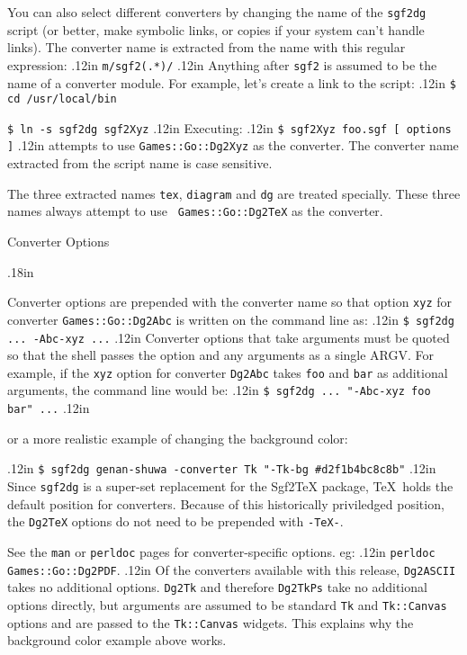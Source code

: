 You can also select different converters by changing the name of
the {\tt sgf2dg} script (or better, make symbolic links, or copies if
your system can't handle links).  The converter name is extracted
from the name with this regular expression:
\vglue.12in
    {\tt m/sgf2(.*)/}
\vglue.12in
Anything after {\tt sgf2} is assumed to be the name of a converter
module.  For example, let's create a link to the script:
\vglue.12in
    {\tt \$ cd /usr/local/bin}

    {\tt \$ ln -s sgf2dg sgf2Xyz}
\vglue.12in
Executing:
\vglue.12in
    {\tt \$ sgf2Xyz foo.sgf [ options ]}
\vglue.12in
\noindent
attempts to use {\tt Games::Go::Dg2Xyz} as the converter.  The
converter name extracted from the script name is case sensitive.


The three extracted names {\tt tex}, {\tt diagram} and {\tt dg}
are treated specially. These three names always attempt to use {\tt
Games::Go::Dg2TeX} as the converter.

% 
% 

\vfil\eject
\centerline{\titlefont Converter Options}
\vglue.18in

Converter options are prepended with the converter name so that
option {\tt xyz} for converter {\tt Games::Go::Dg2Abc} is written on
the command line as:
\vglue.12in
    {\tt \$ sgf2dg ... -Abc-xyz ...}
\vglue.12in
Converter options that take arguments must be quoted so that the
shell passes the option and any arguments as a single ARGV.  For
example, if the {\tt xyz} option for converter {\tt Dg2Abc} takes {\tt foo} and
{\tt bar} as additional arguments, the command line would be:
\vglue.12in
    {\tt \$ sgf2dg ... "-Abc-xyz foo bar" ...}
\vglue.12in

\noindent
or a more realistic example of changing the background color:

\vglue.12in
    {\tt \$ sgf2dg genan-shuwa -converter Tk "-Tk-bg \#d2f1b4bc8c8b"}
\vglue.12in
Since {\tt sgf2dg} is a super-set replacement for the Sgf2TeX package,
\TeX\ holds the default position for converters.  Because of this
historically priviledged position, the {\tt Dg2TeX} options do not need to
be prepended with {\tt -TeX-}.

See the {\tt man} or {\tt perldoc} pages for converter-specific
options.  eg:
\vglue.12in
    {\tt perldoc Games::Go::Dg2PDF}.
\vglue.12in
Of the converters available with this release, {\tt Dg2ASCII} takes
no additional options.  {\tt Dg2Tk} and therefore {\tt Dg2TkPs} take
no additional options directly, but arguments are assumed to be
standard {\tt Tk} and {\tt Tk::Canvas} options and are passed to
the {\tt Tk::Canvas} widgets.  This explains why the background
color example above works.

